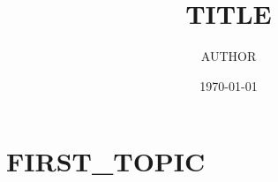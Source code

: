 \documentclass[10pt,a4paper]{amsart}
\theoremstyle{plain}
\theoremstyle{definition}
\theoremstyle{remark}
\begin{document}

\title{{{TITLE}}}
\author{{{AUTHOR}}}
\address{}
\date{\today}

\maketitle
\tableofcontents

\section{{{FIRST_TOPIC}}}\label{sec:topic1}






\end{document}
